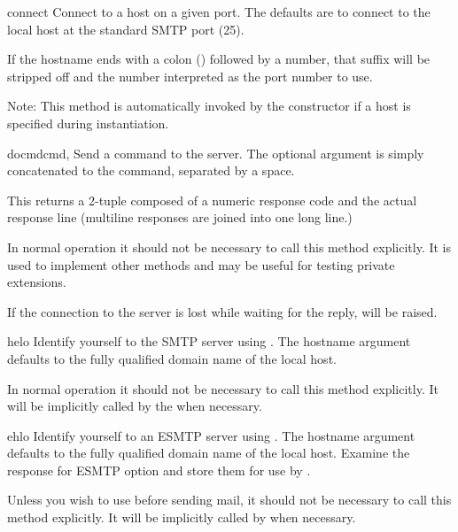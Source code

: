 \begin{methoddesc}{connect}{}
Connect to a host on a given port.  The defaults are to connect to the 
local host at the standard SMTP port (25).

If the hostname ends with a colon (\character{:}) followed by a
number, that suffix will be stripped off and the number interpreted as 
the port number to use.

Note:  This method is automatically invoked by the constructor if a
host is specified during instantiation.
\end{methoddesc}

\begin{methoddesc}{docmd}{cmd, }
Send a command  to the server.  The optional argument
 is simply concatenated to the command, separated by a
space.

This returns a 2-tuple composed of a numeric response code and the
actual response line (multiline responses are joined into one long
line.)

In normal operation it should not be necessary to call this method
explicitly.  It is used to implement other methods and may be useful
for testing private extensions.

If the connection to the server is lost while waiting for the reply,
 will be raised.
\end{methoddesc}

\begin{methoddesc}{helo}{}
Identify yourself to the SMTP server using .  The hostname
argument defaults to the fully qualified domain name of the local
host.

In normal operation it should not be necessary to call this method
explicitly.  It will be implicitly called by the 
when necessary.
\end{methoddesc}

\begin{methoddesc}{ehlo}{}
Identify yourself to an ESMTP server using .  The hostname
argument defaults to the fully qualified domain name of the local
host.  Examine the response for ESMTP option and store them for use by
.

Unless you wish to use  before sending
mail, it should not be necessary to call this method explicitly.  It
will be implicitly called by  when necessary.
\end{methoddesc}

